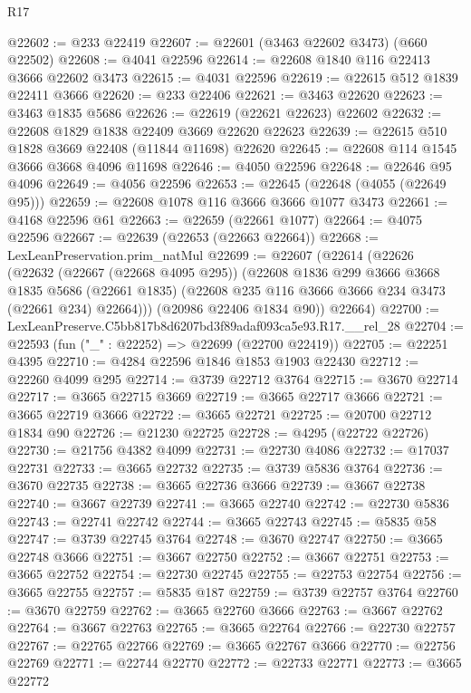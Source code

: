 \begin{lexlean}{R17}
\begin{coremodule}
@22602 := @233 @22419
@22607 := @22601 (@3463 @22602 @3473) (@660 @22502)
@22608 := @4041 @22596
@22614 := @22608 @1840 @116 @22413 @3666 @22602 @3473
@22615 := @4031 @22596
@22619 := @22615 @512 @1839 @22411 @3666
@22620 := @233 @22406
@22621 := @3463 @22620
@22623 := @3463 @1835 @5686
@22626 := @22619 (@22621 @22623) @22602
@22632 := @22608 @1829 @1838 @22409 @3669 @22620 @22623
@22639 := @22615 @510 @1828 @3669 @22408 (@11844 @11698) @22620
@22645 := @22608 @114 @1545 @3666 @3668 @4096 @11698
@22646 := @4050 @22596
@22648 := @22646 @95 @4096
@22649 := @4056 @22596
@22653 := @22645 (@22648 (@4055 (@22649 @95)))
@22659 := @22608 @1078 @116 @3666 @3666 @1077 @3473
@22661 := @4168 @22596 @61
@22663 := @22659 (@22661 @1077)
@22664 := @4075 @22596
@22667 := @22639 (@22653 (@22663 @22664))
@22668 := LexLeanPreservation.prim_natMul
@22699 := @22607
    (@22614
      (@22626
        (@22632
          (@22667 (@22668 @4095 @295))
          (@22608
            @1836
            @299
            @3666
            @3668
            @1835
            @5686
            (@22661 @1835)
            (@22608 @235 @116 @3666 @3666 @234 @3473 (@22661 @234) @22664)))
        (@20986 @22406 @1834 @90))
      @22664)
@22700 := LexLeanPreserve.C5bb817b8d6207bd3f89adaf093ca5e93.R17.__rel_28
@22704 := @22593 (fun ("_" : @22252) => @22699 (@22700 @22419))
@22705 := @22251 @4395
@22710 := @4284 @22596 @1846 @1853 @1903 @22430
@22712 := @22260 @4099 @295
@22714 := @3739 @22712 @3764
@22715 := @3670 @22714
@22717 := @3665 @22715 @3669
@22719 := @3665 @22717 @3666
@22721 := @3665 @22719 @3666
@22722 := @3665 @22721
@22725 := @20700 @22712 @1834 @90
@22726 := @21230 @22725
@22728 := @4295 (@22722 @22726)
@22730 := @21756 @4382 @4099
@22731 := @22730 @4086
@22732 := @17037 @22731
@22733 := @3665 @22732
@22735 := @3739 @5836 @3764
@22736 := @3670 @22735
@22738 := @3665 @22736 @3666
@22739 := @3667 @22738
@22740 := @3667 @22739
@22741 := @3665 @22740
@22742 := @22730 @5836
@22743 := @22741 @22742
@22744 := @3665 @22743
@22745 := @5835 @58
@22747 := @3739 @22745 @3764
@22748 := @3670 @22747
@22750 := @3665 @22748 @3666
@22751 := @3667 @22750
@22752 := @3667 @22751
@22753 := @3665 @22752
@22754 := @22730 @22745
@22755 := @22753 @22754
@22756 := @3665 @22755
@22757 := @5835 @187
@22759 := @3739 @22757 @3764
@22760 := @3670 @22759
@22762 := @3665 @22760 @3666
@22763 := @3667 @22762
@22764 := @3667 @22763
@22765 := @3665 @22764
@22766 := @22730 @22757
@22767 := @22765 @22766
@22769 := @3665 @22767 @3666
@22770 := @22756 @22769
@22771 := @22744 @22770
@22772 := @22733 @22771
@22773 := @3665 @22772

\end{coremodule}
\end{lexlean}
